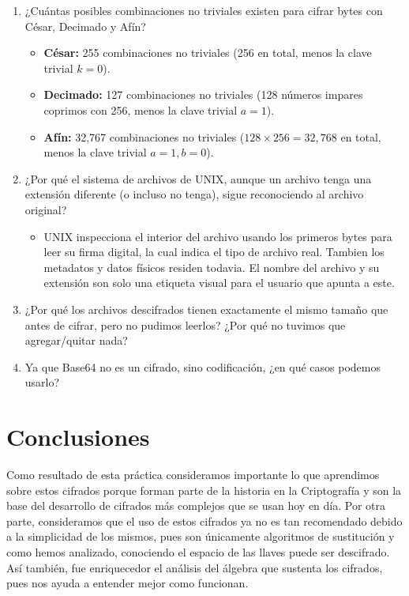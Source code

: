 \documentclass[12pt, a4paper]{article}
\begin{document}
\begin{enumerate}
    \item ¿Cuántas posibles combinaciones no triviales existen para cifrar bytes con César, Decimado y Afín?
    \begin{itemize}
        \item \textbf{César:} 255 combinaciones no triviales (256 en total, menos la clave trivial $k=0$).
        \item \textbf{Decimado:} 127 combinaciones no triviales (128 números impares coprimos con 256, menos la clave trivial $a=1$).
        \item \textbf{Afín:} 32,767 combinaciones no triviales ($128 \times 256 = 32,768$ en total, menos la clave trivial $a=1, b=0$).
    \end{itemize}
    \item ¿Por qué el sistema de archivos de UNIX, aunque un archivo tenga una extensión diferente (o incluso no tenga), sigue reconociendo al archivo original?
    \begin{itemize}
    \item UNIX inspecciona el interior del archivo usando los primeros bytes para leer su firma digital, la cual indica el tipo de archivo real. Tambien los metadatos y datos físicos residen todavia. 
    El nombre del archivo y su extensión son solo una etiqueta visual para el usuario que apunta a este.\\

    \end{itemize}
    \item ¿Por qué los archivos descifrados tienen exactamente el mismo tamaño que antes de cifrar, pero no pudimos leerlos? ¿Por qué no tuvimos que agregar/quitar nada?
    \item Ya que Base64 no es un cifrado, sino codificación, ¿en qué casos podemos usarlo?
\end{enumerate}


\section{Conclusiones}

Como resultado de esta práctica consideramos importante lo que aprendimos sobre estos cifrados porque forman parte de la 
historia en la Criptografía y son la base del desarrollo de cifrados más complejos que se usan hoy en día. Por otra parte,
consideramos que el uso de estos cifrados ya no es tan recomendado debido a la simplicidad de los mismos, pues son
únicamente algoritmos de sustitución y como hemos analizado, conociendo el espacio de las llaves puede ser descifrado.
Así también, fue enriquecedor el análisis del álgebra que sustenta los cifrados, pues nos ayuda a entender mejor como funcionan.
\end{document}
